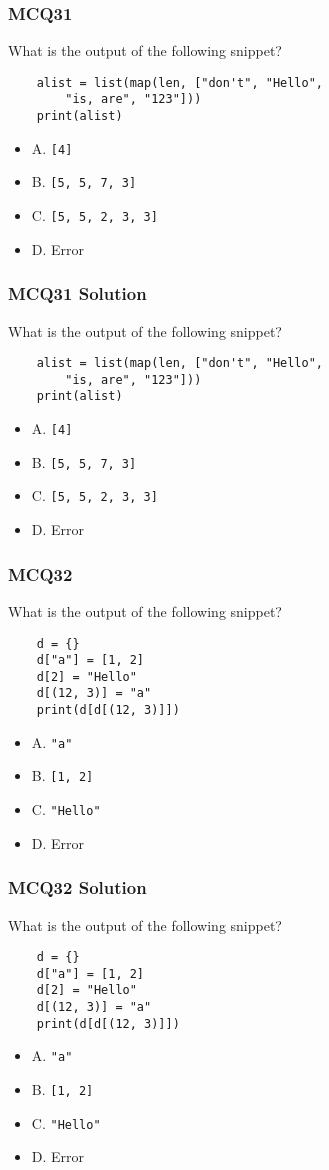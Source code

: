 \documentclass{beamer}
\begin{document}
\begin{frame}[fragile]
    \frametitle{MCQ31}
    What is the output of the following snippet?
    \begin{verbatim}
    alist = list(map(len, ["don't", "Hello",
        "is, are", "123"]))
    print(alist)
    \end{verbatim}
    \begin{itemize}
        \item A. \texttt{[4]}
        \item B. \texttt{[5, 5, 7, 3]}
        \item C. \texttt{[5, 5, 2, 3, 3]}
        \item D. Error
    \end{itemize}
\end{frame}
\begin{frame}[fragile]
    \frametitle{MCQ31 Solution}
    What is the output of the following snippet?
    \begin{verbatim}
    alist = list(map(len, ["don't", "Hello",
        "is, are", "123"]))
    print(alist)
    \end{verbatim}
    \begin{itemize}
        \item A. \texttt{[4]}
        \item \alert{B. \texttt{[5, 5, 7, 3]}}
        \item C. \texttt{[5, 5, 2, 3, 3]}
        \item D. Error
    \end{itemize}
\end{frame}

\begin{frame}[fragile]
    \frametitle{MCQ32}
    What is the output of the following snippet?
    \begin{verbatim}
    d = {}
    d["a"] = [1, 2]
    d[2] = "Hello"
    d[(12, 3)] = "a"
    print(d[d[(12, 3)]])
    \end{verbatim}
    \begin{itemize}
        \item A. \texttt{"a"}
        \item B. \texttt{[1, 2]}
        \item C. \texttt{"Hello"}
        \item D. Error
    \end{itemize}
\end{frame}
\begin{frame}[fragile]
    \frametitle{MCQ32 Solution}
    What is the output of the following snippet?
    \begin{verbatim}
    d = {}
    d["a"] = [1, 2]
    d[2] = "Hello"
    d[(12, 3)] = "a"
    print(d[d[(12, 3)]])
    \end{verbatim}
    \begin{itemize}
        \item A. \texttt{"a"}
        \item \alert{B. \texttt{[1, 2]}}
        \item C. \texttt{"Hello"}
        \item D. Error
    \end{itemize}
\end{frame}
\end{document}

